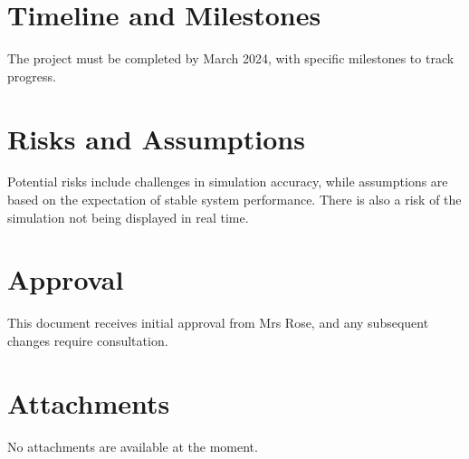 \documentclass{article}
\begin{document}
	\section{Timeline and Milestones}
	The project must be completed by March 2024, with specific milestones to track progress.
	
	\section{Risks and Assumptions}
	Potential risks include challenges in simulation accuracy, while assumptions are based on the expectation of stable system performance. There is also a risk of the simulation not being displayed in real time.
	
	\section{Approval}
	This document receives initial approval from Mrs Rose, and any subsequent changes require consultation.
	
	\section{Attachments}
	No attachments are available at the moment.
	
\end{document}
